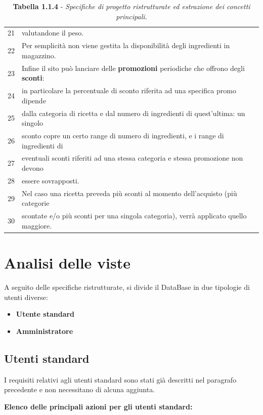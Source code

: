 \begin{table}[H]
\begin{tabularx}{\textwidth}{|c|X|}
21 & valutandone il peso. \\
22 & Per semplicità non viene gestita la disponibilità degli ingredienti in magazzino. \\
23 & Infine il sito può lanciare delle \textbf{promozioni} periodiche che offrono degli \textbf{sconti}:\\
24 & in particolare la percentuale di sconto riferita ad una specifica promo dipende \\
25 & dalla categoria di ricetta e dal numero di ingredienti di quest’ultima: un singolo \\
26 & sconto copre un certo range di numero di ingredienti, e i range di ingredienti di \\
27 & eventuali sconti riferiti ad una stessa categoria e stessa promozione non devono \\
28 & essere sovrapposti. \\
29 & Nel caso una ricetta preveda più sconti al momento dell’acquisto (più categorie \\
30 & scontate e/o più sconti per una singola categoria), verrà applicato quello maggiore. \\
\hline
\end{tabularx}
\caption*{\textbf{Tabella 1.1.4} - \textit{Specifiche di progetto ristrutturate ed estrazione dei concetti principali.}}
\end{table}


\section{Analisi delle viste}

A seguito delle specifiche ristrutturate, si divide il DataBase in due tipologie di utenti diverse:

\begin{itemize}
    \item \textbf{Utente standard}
    \item \textbf{Amministratore}
\end{itemize}

\subsection{Utenti standard}

I requisiti relativi agli utenti standard sono stati già descritti nel paragrafo precedente e non necessitano di alcuna aggiunta.

\textbf{Elenco delle principali azioni per gli utenti standard:}\\

